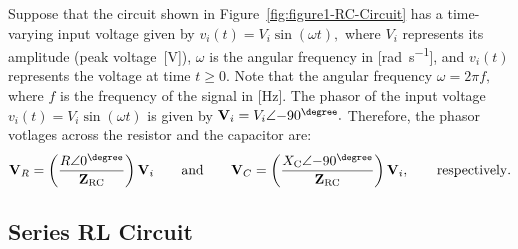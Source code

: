 Suppose that the circuit shown in Figure~\ref{fig:figure1-RC-Circuit} has a time-varying input voltage given by $v_i(t) = V_i\sin(\omega t),$ where $V_i$ represents its amplitude (peak voltage~[\si{\volt}]), $\omega$ is the angular frequency in [\si{\radian\per\second}], and $v_i(t)$ represents the voltage at time $t\ge 0.$ Note that the angular frequency $\omega = 2\pi f,$ where $f$ is the frequency of the signal in [\si{\hertz}]. The phasor of the input voltage $v_i(t) = V_i\sin(\omega t)$ is given by ${\bf V}_i = V_i\angle{-90^{\degree}}.$ Therefore, the phasor votlages across the resistor and the capacitor are: %
%
\begin{align*}
  {\bf V}_R = \left(\frac{R\angle{0^{\degree}}}{{\bf Z}_{\text{RC}}}\right){\bf V}_i\qquad\text{and}\qquad {\bf V}_C = \left(\frac{X_{\text{C}}\angle{-90^{\degree}}}{{\bf Z}_{\text{RC}}}\right) {\bf V}_i,\qquad\mathrm{respectively}.
\end{align*}
%






\subsection{Series RL Circuit}
\label{sec:voltageDivider}

